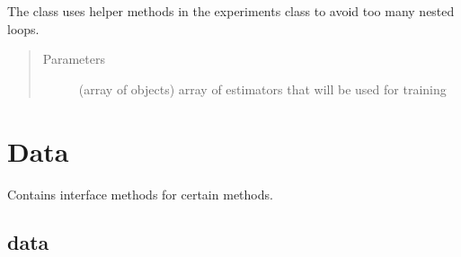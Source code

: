\documentclass[letterpaper,10pt,english]{sphinxmanual}
\begin{document}
\begin{fulllineitems}
\begin{fulllineitems}
The class uses helper methods in the experiments class to avoid too many nested loops.
\begin{quote}\begin{description}
\item[{Parameters}] \leavevmode
{} (array of {\hyperref[\detokenize{estimators:mleap-estimator-label}]{}} objects) \textendash{} array of estimators that will be used for training

\end{description}\end{quote}

\end{fulllineitems}


\end{fulllineitems}



\section{Data}
\label{\detokenize{data:id1}}\label{\detokenize{data::doc}}\label{\detokenize{data:data}}
Contains interface methods for certain {\hyperref[\detokenize{shared:files-io-label}]{}} methods.


\subsection{data}
\label{\detokenize{data:id2}}\label{\detokenize{data:module-mleap.data.data}}
\end{document}
